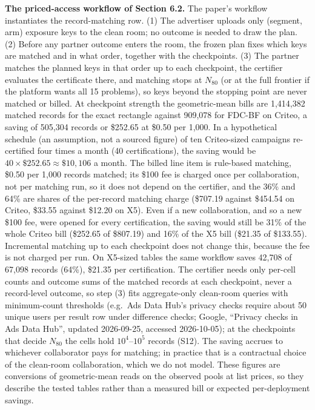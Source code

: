 \documentclass[sigconf,anonymous,review]{acmart}
\begin{document}
\textbf{The priced-access workflow of Section 6.2.} The paper's workflow instantiates the record-matching row. (1) The advertiser uploads only (segment, arm) exposure keys to the clean room; no outcome is needed to draw the plan. (2) Before any partner outcome enters the room, the frozen plan fixes which keys are matched and in what order, together with the checkpoints. (3) The partner matches the planned keys in that order up to each checkpoint, the certifier evaluates the certificate there, and matching stops at $N_{80}$ (or at the full frontier if the platform wants all 15 problems), so keys beyond the stopping point are never matched or billed. At checkpoint strength the geometric-mean bills are 1,414,382 matched records for the exact rectangle against 909,078 for FDC-BF on Criteo, a saving of 505,304 records or \$252.65 at \$0.50 per 1,000. In a hypothetical schedule (an assumption, not a sourced figure) of ten Criteo-sized campaigns re-certified four times a month (40 certifications), the saving would be $40 \times \$252.65 \approx \$10{,}106$ a month. The billed line item is rule-based matching, \$0.50 per 1,000 records matched; its \$100 fee is charged once per collaboration, not per matching run, so it does not depend on the certifier, and the 36\% and 64\% are shares of the per-record matching charge (\$707.19 against \$454.54 on Criteo, \$33.55 against \$12.20 on X5). Even if a new collaboration, and so a new \$100 fee, were opened for every certification, the saving would still be 31\% of the whole Criteo bill (\$252.65 of \$807.19) and 16\% of the X5 bill (\$21.35 of \$133.55). Incremental matching up to each checkpoint does not change this, because the fee is not charged per run. On X5-sized tables the same workflow saves 42,708 of 67,098 records (64\%), \$21.35 per certification. The certifier needs only per-cell counts and outcome sums of the matched records at each checkpoint, never a record-level outcome, so step (3) fits aggregate-only clean-room queries with minimum-count thresholds (e.g.\ Ads Data Hub's privacy checks require about 50 unique users per result row under difference checks; Google, ``Privacy checks in Ads Data Hub'', updated 2026-09-25, accessed 2026-10-05); at the checkpoints that decide $N_{80}$ the cells hold $10^4$--$10^5$ records (S12). The saving accrues to whichever collaborator pays for matching; in practice that is a contractual choice of the clean-room collaboration, which we do not model. These figures are conversions of geometric-mean reads on the observed pools at list prices, so they describe the tested tables rather than a measured bill or expected per-deployment savings.
\end{document}
